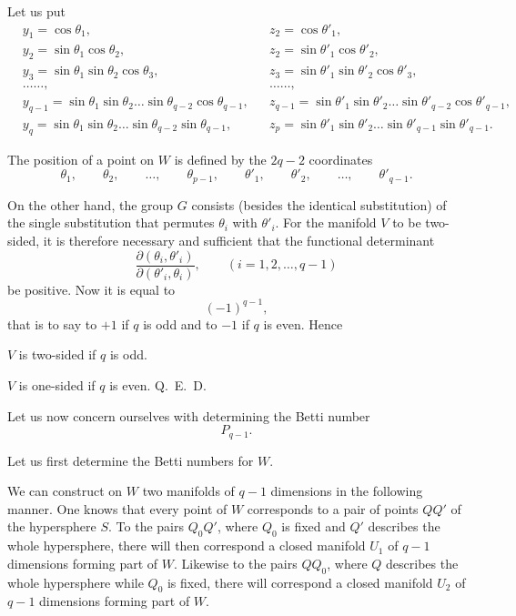 \documentclass{article}
\begin{document}
Let us put
\[ \begin{aligned} &y_{1} = \cos \theta_{1}, &&z_{2} = \cos \theta'_{1},\\ &y_{2} = \sin \theta_{1} \cos \theta_{2}, &&z_{2} = \sin \theta'_{1} \cos \theta'_{2},\\ &y_{3} = \sin \theta_{1} \sin \theta_{2} \cos \theta_{3}, &&z_{3} = \sin \theta'_{1} \sin \theta'_{2} \cos \theta'_{3},\\ &\ldots\ldots, &&\ldots\ldots,\\ &y_{q-1} = \sin \theta_{1} \sin \theta_{2} \ldots \sin \theta_{q-2} \cos \theta_{q-1}, &&z_{q-1} = \sin \theta'_{1} \sin \theta'_{2} \ldots \sin \theta'_{q-2} \cos \theta'_{q-1},\\ &y_{q} = \sin \theta_{1} \sin \theta_{2} \ldots \sin \theta_{q-2} \sin \theta_{q-1}, &&z_{p} = \sin \theta'_{1} \sin \theta'_{2} \ldots \sin \theta'_{q-1} \sin \theta'_{q-1}. \end{aligned} \]

The position of a point on $W$ is defined by the $2q - 2$ coordinates
\[ \theta_{1}, \qquad \theta_{2}, \qquad \ldots, \qquad \theta_{p-1}, \qquad \theta'_{1}, \qquad \theta'_{2}, \qquad \ldots, \qquad \theta'_{q-1}. \]

On the other hand, the group $G$ consists (besides the identical substitution) of the single substitution that permutes $\theta_{i}$ with $\theta'_{i}$. For the manifold $V$ to be two-sided, it is therefore necessary and sufficient that the functional determinant
\[ \frac{\partial(\theta_{i}, \theta'_{i})}{\partial(\theta'_{i}, \theta_{i})}, \qquad (i = 1, 2, \ldots, q - 1) \]
be positive. Now it is equal to
\[ (-1)^{q-1}, \]
that is to say to $+1$ if $q$ is odd and to $-1$ if $q$ is even. Hence

$V$ is two-sided if $q$ is odd.

$V$ is one-sided if $q$ is even. Q.~E.~D.

Let us now concern ourselves with determining the Betti number
\[ P_{q-1}. \]

Let us first determine the Betti numbers for $W$.

We can construct on $W$ two manifolds of $q - 1$ dimensions in the following manner. One knows that every point of $W$ corresponds to a pair of points $QQ'$ of the hypersphere $S$. To the pairs $Q_{0}Q'$, where $Q_{0}$ is fixed and $Q'$ describes the whole hypersphere, there will then correspond a closed manifold $U_{1}$ of $q - 1$ dimensions forming part of $W$. Likewise to the pairs $QQ_{0}$, where $Q$ describes the whole hypersphere while $Q_{0}$ is fixed, there will correspond a closed manifold $U_{2}$ of $q - 1$ dimensions forming part of $W$.
\end{document}
